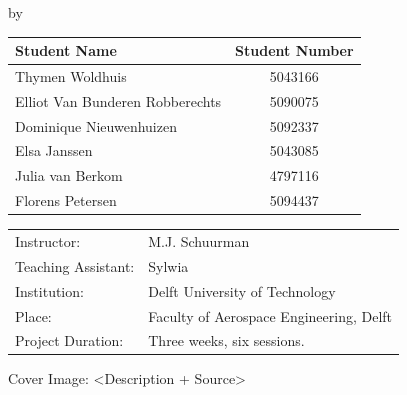 \begin{titlepage}

\begin{center}

{\makeatletter
\largetitlestyle\fontsize{45}{45}\selectfont\@title
\makeatother}

{\makeatletter
\titlestyle\fontsize{20}{20}\selectfont\@subtitle    
\makeatother}

\bigskip
\bigskip

by

\bigskip
\bigskip

{\makeatletter
\largetitlestyle\fontsize{25}{25}\selectfont\@author
\makeatother}

\bigskip
\bigskip

\setlength\extrarowheight{2pt}
\begin{tabular}{lc}
    Student Name & Student Number \\\hline
    Thymen Woldhuis & 5043166 \\
    Elliot Van Bunderen Robberechts & 5090075 \\
    Dominique Nieuwenhuizen & 5092337  \\
    Elsa Janssen & 5043085  \\
    Julia van Berkom & 4797116 \\
    Florens Petersen & 5094437 \\
\end{tabular}

\vfill

\begin{tabular}{ll}
    Instructor: & M.J. Schuurman \\
    Teaching Assistant: & Sylwia \\
    Institution: & Delft University of Technology \\
    Place: & Faculty of Aerospace Engineering, Delft \\
    Project Duration: & Three weeks, six sessions.
    
\end{tabular}

\vspace{1cm}
\small{Cover Image: <Description + Source>}

\end{center}


\end{titlepage}